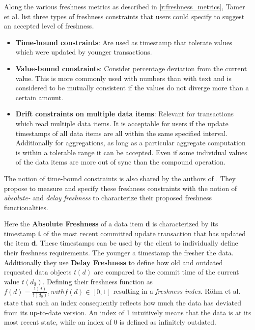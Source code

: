 Along the various freshness metrics as described in \ref{r:freshness_metrics}, Tamer et al. \cite{tamer:2005} list three types of freshness constraints that users could specify to
suggest an accepted level of freshness.
\begin{itemize}
    \item \textbf{Time-bound constraints}: Are used as timestamp that tolerate values which were updated by younger transactions. 

    \item \textbf{Value-bound constraints}: Consider percentage deviation from the current value. This is more commonly used with numbers than with text and is considered to
    be mutually consistent if the values do not diverge more than a certain amount.

    \item \textbf{Drift constraints on multiple data items}: Relevant for transactions which read multiple data items. It is acceptable for users if the update timestamps 
    of all data items are all within the same specified interval. Additionally for aggregations, as long as a particular aggregate computation 
    is within a tolerable range it can be accepted. Even if some individual values of the data items are more out of sync than the compound operation.

\end{itemize}

The notion of time-bound constraints is also shared by the authors of \cite{voicu:2010}. They propose to measure and specify these freshness constraints 
with the notion of \emph{absolute-} and \emph{delay freshness} to characterize their proposed freshness functionalities.

Here the \textbf{Absolute Freshness} of a data item \textbf{d} is characterized by its timestamp \textbf{t}
of the most recent committed update transaction that has updated the item \textbf{d}.
These timestamps can be used by the client to individually define their freshness requirements. The younger a timestamp the fresher the data.
Additionally they use \textbf{Delay Freshness} to define how old and outdated requested data objects $t(d)$ are compared to the commit time of the current value $t(d_0)$.
Defining their freshness function as $f(d) = \frac{t(d)}{t(d_0)}, with f(d) \in [0,1]$ resulting in a \emph{freshness index}.
Röhm et al. \cite{rohm:2002} state that such an index consequently reflects how much the data has deviated from its up-to-date version.
An index of 1 intuitively means that the data is at its most recent state, while an index of 0 is defined as infinitely outdated.

